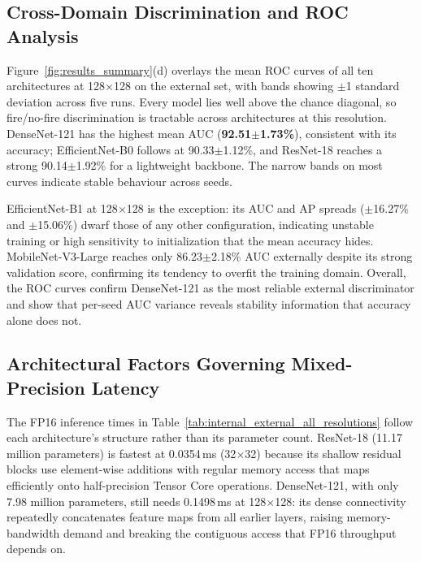 \documentclass[conference]{IEEEtran}
\begin{document}
\subsection{Cross-Domain Discrimination and ROC Analysis}

Figure~\ref{fig:results_summary}(d) overlays the mean ROC curves of all ten architectures at 128$\times$128 on the external set, with bands showing $\pm$1 standard deviation across five runs. Every model lies well above the chance diagonal, so fire/no-fire discrimination is tractable across architectures at this resolution. DenseNet-121 has the highest mean AUC (\textbf{92.51$\pm$1.73\%}), consistent with its accuracy; EfficientNet-B0 follows at 90.33$\pm$1.12\%, and ResNet-18 reaches a strong 90.14$\pm$1.92\% for a lightweight backbone. The narrow bands on most curves indicate stable behaviour across seeds.

EfficientNet-B1 at 128$\times$128 is the exception: its AUC and AP spreads ($\pm$16.27\% and $\pm$15.06\%) dwarf those of any other configuration, indicating unstable training or high sensitivity to initialization that the mean accuracy hides. MobileNet-V3-Large reaches only 86.23$\pm$2.18\% AUC externally despite its strong validation score, confirming its tendency to overfit the training domain. Overall, the ROC curves confirm DenseNet-121 as the most reliable external discriminator and show that per-seed AUC variance reveals stability information that accuracy alone does not.

\subsection{Architectural Factors Governing Mixed-Precision Latency}

The FP16 inference times in Table~\ref{tab:internal_external_all_resolutions} follow each architecture's structure rather than its parameter count. ResNet-18 (11.17 million parameters) is fastest at 0.0354\,ms (32$\times$32) because its shallow residual blocks use element-wise additions with regular memory access that maps efficiently onto half-precision Tensor Core operations. DenseNet-121, with only 7.98 million parameters, still needs 0.1498\,ms at 128$\times$128: its dense connectivity repeatedly concatenates feature maps from all earlier layers, raising memory-bandwidth demand and breaking the contiguous access that FP16 throughput depends on.
\end{document}
